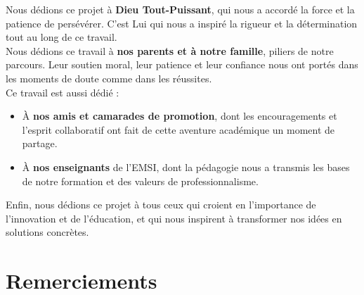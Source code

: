 \documentclass[12pt, a4paper]{report}
\begin{document}
\begin{onehalfspace}
    Nous dédions ce projet à \textbf{Dieu Tout-Puissant}, qui nous a accordé la force et la patience de persévérer. C'est Lui qui nous a inspiré la rigueur et la détermination tout au long de ce travail.\\
    
    Nous dédions ce travail à \textbf{nos parents et à notre famille}, piliers de notre parcours. Leur soutien moral, leur patience et leur confiance nous ont portés dans les moments de doute comme dans les réussites.\\

    Ce travail est aussi dédié :
    \begin{itemize}
        \item À \textbf{nos amis et camarades de promotion}, dont les encouragements et l'esprit collaboratif ont fait de cette aventure académique un moment de partage.
        \item À \textbf{nos enseignants} de l'EMSI, dont la pédagogie nous a transmis les bases de notre formation et des valeurs de professionnalisme.\\
    \end{itemize}

    Enfin, nous dédions ce projet à tous ceux qui croient en l'importance de l'innovation et de l'éducation, et qui nous inspirent à transformer nos idées en solutions concrètes.
\end{onehalfspace}

\chapter*{Remerciements}
\end{document}
